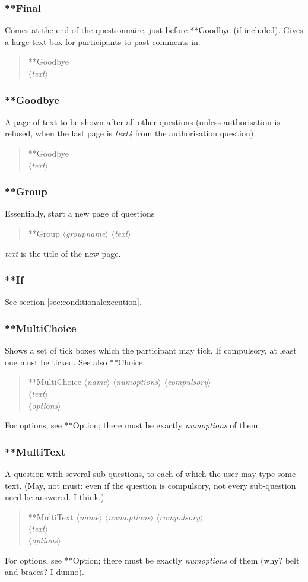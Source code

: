 \documentclass[11pt,a4paper]{article}
\newcommand{\phr}[1]{$\langle$\emph{#1}$\rangle$}
\newcommand{\secref}[1]{section \ref{sec:#1}}
\begin{document}
\subsubsection{**Final}
Comes at the end of the questionnaire, just before **Goodbye (if included). Gives a large text box for participants to past comments in. 
\begin{quote}
**Goodbye \\
\phr{text}
\end{quote}

\subsubsection{**Goodbye}
A page of text to be shown after all other questions (unless authorisation is refused, when the last page is \emph{text4} from the authorisation question). 
\begin{quote}
**Goodbye \\
\phr{text}
\end{quote}

\subsubsection{**Group}
Essentially, start a new page of questions
\begin{quote}
**Group \phr{groupname} \phr{text}
\end{quote}
\emph{text} is the title of the new page.

\subsubsection{**If}
See \secref{conditionalexecution}.

\subsubsection{**MultiChoice}
Shows a set of tick boxes which the participant may tick. If compulsory, at least one must be ticked. See also **Choice.
\begin{quote}
**MultiChoice \phr{name} \phr{numoptions} \phr{compulsory}\\
\phr{text} \\
\phr{options}
\end{quote}
For options, see **Option; there must be exactly \emph{numoptions} of them.

\subsubsection{**MultiText}
A question with several sub-questions, to each of which the user may type some text. (May, not must: even if the question is compulsory, not every sub-question need be answered. I think.)
\begin{quote}
**MultiText \phr{name} \phr{numoptions} \phr{compulsory}\\
\phr{text} \\
\phr{options}
\end{quote}
For options, see **Option; there must be exactly \emph{numoptions} of them (why? belt and braces? I dunno).
\end{document}
